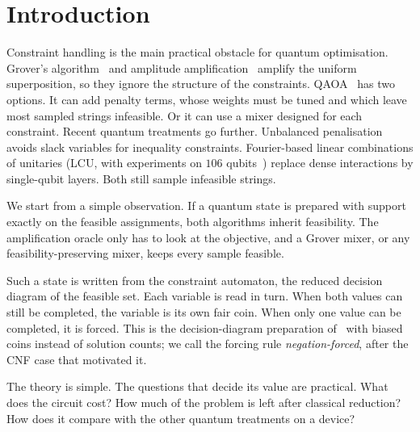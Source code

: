 \documentclass[10pt,twocolumn]{article}
\begin{document}
\begin{abstract}
\end{abstract}

\section{Introduction}
Constraint handling is the main practical obstacle for quantum optimisation. Grover's algorithm~\cite{grover1996} and amplitude amplification~\cite{bhmt2002} amplify the uniform superposition, so they ignore the structure of the constraints. QAOA~\cite{farhi2014,hadfield2019} has two options. It can add penalty terms, whose weights must be tuned and which leave most sampled strings infeasible. Or it can use a mixer designed for each constraint. Recent quantum treatments go further. Unbalanced penalisation~\cite{montanez2024unbalanced} avoids slack variables for inequality constraints. Fourier-based linear combinations of unitaries (LCU, with experiments on $106$ qubits~\cite{carrera2026fourier}) replace dense interactions by single-qubit layers. Both still sample infeasible strings.

We start from a simple observation. If a quantum state is prepared with support exactly on the feasible assignments, both algorithms inherit feasibility. The amplification oracle only has to look at the objective, and a Grover mixer, or any feasibility-preserving mixer, keeps every sample feasible.

Such a state is written from the constraint automaton, the reduced decision diagram of the feasible set. Each variable is read in turn. When both values can still be completed, the variable is its own fair coin. When only one value can be completed, it is forced. This is the decision-diagram preparation of~\cite{mozafari2020bdd} with biased coins instead of solution counts; we call the forcing rule \emph{negation-forced}, after the CNF case that motivated it.

The theory is simple. The questions that decide its value are practical. What does the circuit cost? How much of the problem is left after classical reduction? How does it compare with the other quantum treatments on a device?
\end{document}
